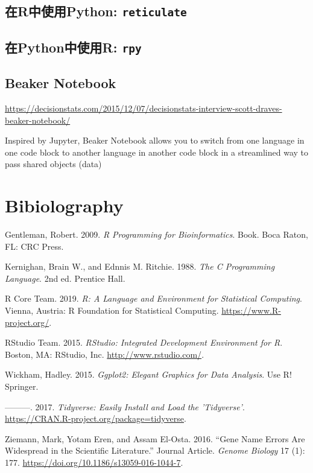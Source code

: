 \documentclass[]{book}
\begin{document}
\hypertarget{rpython-reticulate}{%
\section{\texorpdfstring{在R中使用Python: \texttt{reticulate}}{在R中使用Python: reticulate}}\label{rpython-reticulate}}

\hypertarget{pythonr-rpy}{%
\section{\texorpdfstring{在Python中使用R: \texttt{rpy}}{在Python中使用R: rpy}}\label{pythonr-rpy}}

\hypertarget{beaker-notebook}{%
\section{Beaker Notebook}\label{beaker-notebook}}

\url{https://decisionstats.com/2015/12/07/decisionstats-interview-scott-draves-beaker-notebook/}

Inspired by Jupyter, Beaker Notebook allows you to switch from one language in one code block to another language in another code block in a streamlined way to pass shared objects (data)

\hypertarget{bibiolography}{%
\chapter*{Bibiolography}\label{bibiolography}}

\hypertarget{refs}{}
\leavevmode\hypertarget{ref-Gentleman2009R-Programming-Bioinfo}{}%
Gentleman, Robert. 2009. \emph{R Programming for Bioinformatics}. Book. Boca Raton, FL: CRC Press.

\leavevmode\hypertarget{ref-Kernighan1988The-C-Programming-La}{}%
Kernighan, Brain W., and Ednnis M. Ritchie. 1988. \emph{The C Programming Language}. 2nd ed. Prentice Hall.

\leavevmode\hypertarget{ref-R-base}{}%
R Core Team. 2019. \emph{R: A Language and Environment for Statistical Computing}. Vienna, Austria: R Foundation for Statistical Computing. \url{https://www.R-project.org/}.

\leavevmode\hypertarget{ref-R-rstudio}{}%
RStudio Team. 2015. \emph{RStudio: Integrated Development Environment for R}. Boston, MA: RStudio, Inc. \url{http://www.rstudio.com/}.

\leavevmode\hypertarget{ref-Wickham2015ggplot2-Elegant-Gra}{}%
Wickham, Hadley. 2015. \emph{Ggplot2: Elegant Graphics for Data Analysis}. Use R! Springer.

\leavevmode\hypertarget{ref-R-tidyverse}{}%
---------. 2017. \emph{Tidyverse: Easily Install and Load the 'Tidyverse'}. \url{https://CRAN.R-project.org/package=tidyverse}.

\leavevmode\hypertarget{ref-Ziemann2016Gene-name-errors}{}%
Ziemann, Mark, Yotam Eren, and Assam El-Osta. 2016. ``Gene Name Errors Are Widespread in the Scientific Literature.'' Journal Article. \emph{Genome Biology} 17 (1): 177. \url{https://doi.org/10.1186/s13059-016-1044-7}.
\end{document}
